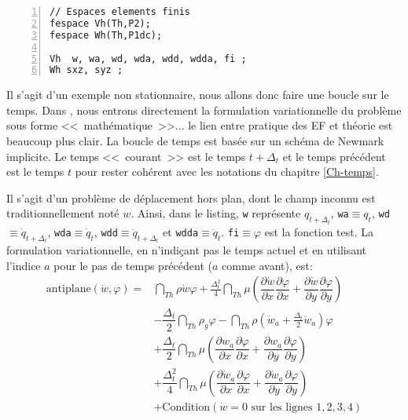 \color{gris}\scriptsize
\begin{Verbatim}[numbers=left,numbersep=3pt,firstnumber=last]
// Espaces elements finis  
fespace Vh(Th,P2); 
fespace Wh(Th,P1dc);

Vh  w, wa, wd, wda, wdd, wdda, fi ; 
Wh sxz, syz ; 
\end{Verbatim}
\color{black}\normalsize

\medskip
Il s'agit d'un exemple non stationnaire, nous allons donc faire une boucle sur le temps. 
Dans \freefem, nous entrons directement la formulation variationnelle du problème sous forme <<~mathématique~>>... 
le lien entre pratique des EF et théorie est beaucoup plus clair. 
La boucle de temps est basée sur un schéma de Newmark implicite. Le temps <<~courant~>>
est le temps $t+\Delta_t$ et le temps précédent est le temps $t$ pour rester cohérent avec
les notations du chapitre \ref{Ch-temps}.

Il s'agit d'un problème de déplacement hors plan, dont le champ inconnu est traditionnellement
noté $w$. Ainsi, dans le listing, \verb|w| représente $q_{t+\Delta_t}$, \verb|wa|$\equiv q_t$, 
\verb|wd|$\equiv \dot{q}_{t+\Delta_t}$, \verb|wda|$\equiv \dot{q}_t$, 
\verb|wdd|$\equiv \ddot{q}_{t+\Delta_t}$ et \verb|wdda|$\equiv \ddot{q}_t$. \verb|fi|$\equiv\varphi$
est la fonction test. La formulation variationnelle, en n'indiçant pas le temps actuel et en utilisant l'indice $a$
pour le pas de temps précédent ($a$ comme avant), est:
\begin{equation}
\begin{array}{rl}
\text{antiplane}(\dot{w},\varphi) = &
	\dint_{Th} \rho \dot{w} \varphi + 
		\frac{\Delta_t^2}4 \dint_{Th}  \mu \left( \dfrac{\partial \dot{w}}{\partial x}\dfrac{\partial \varphi}{\partial x} +
		\dfrac{\partial \dot{w}}{\partial y}\dfrac{\partial \varphi}{\partial y}\right)\\[+3ex]
	& - 	\dfrac{\Delta_t}2 \dint_{Th} \rho_g \varphi 
	-  \dint_{Th} \rho\left(\dot{w}_a+\frac{\Delta_t}2 \ddot{w}_a\right)\varphi \\[+3ex]
	& + \dfrac{\Delta_t}2 \dint_{Th} \mu \left( \dfrac{\partial w_a}{\partial x}\dfrac{\partial \varphi}{\partial x}
		+ \dfrac{\partial w_a}{\partial y}\dfrac{\partial \varphi}{\partial y} \right) \\[+3ex]
	& + \dfrac{\Delta_t^2}4 \dint_{Th} \mu \left( \dfrac{\partial \dot{w}_a}{\partial x}\dfrac{\partial \varphi}{\partial x} +
		\dfrac{\partial \dot{w}_a}{\partial y}\dfrac{\partial \varphi}{\partial y} \right) \\[+3ex]
	& + \text{Condition} (\dot{w}=0 \text{ sur les lignes } 1,2,3,4)
\end{array}
\end{equation}

